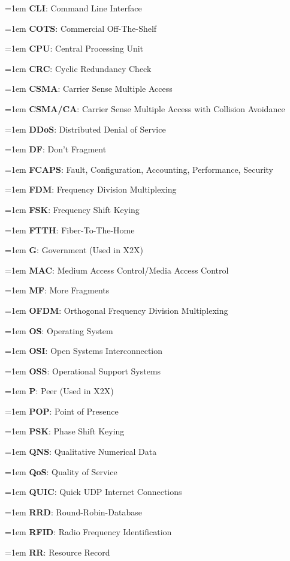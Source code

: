 \documentclass[letterpaper,8pt]{extarticle}
\newcommand{\definition}[2]{
  \hangindent=1em
  \textbf{#1}: #2%
}
\begin{document}
\begin{multicols*}{5}
\begin{multicols*}{2}
    \definition{CLI}{Command Line Interface}
    
    \definition{COTS}{Commercial Off-The-Shelf}
    
    \definition{CPU}{Central Processing Unit}
    
    \definition{CRC}{Cyclic Redundancy Check}
    
    \definition{CSMA}{Carrier Sense Multiple Access}
    
    \definition{CSMA/CA}{Carrier Sense Multiple Access with Collision Avoidance}
    
    \definition{DDoS}{Distributed Denial of Service}
    
    \definition{DF}{Don't Fragment}
    
    \definition{FCAPS}{Fault, Configuration, Accounting, Performance, Security}
    
    \definition{FDM}{Frequency Division Multiplexing}
    
    \definition{FSK}{Frequency Shift Keying}
    
    \definition{FTTH}{Fiber-To-The-Home}
    
    \definition{G}{Government (Used in X2X)}
    
    \definition{MAC}{Medium Access Control/Media Access Control}
    
    \definition{MF}{More Fragments}
    
    \definition{OFDM}{Orthogonal Frequency Division Multiplexing}
    
    \definition{OS}{Operating System}
    
    \definition{OSI}{Open Systems Interconnection}
    
    \definition{OSS}{Operational Support Systems}
    
    \definition{P}{Peer (Used in X2X)}
    
    \definition{POP}{Point of Presence}
    
    \definition{PSK}{Phase Shift Keying}
    
    \definition{QNS}{Qualitative Numerical Data}
    
    \definition{QoS}{Quality of Service}
    
    \definition{QUIC}{Quick UDP Internet Connections}
    
    \definition{RRD}{Round-Robin-Database}
    
    \definition{RFID}{Radio Frequency Identification}
    
    \definition{RR}{Resource Record}
    

\end{multicols*}
\end{multicols*}
\end{document}
